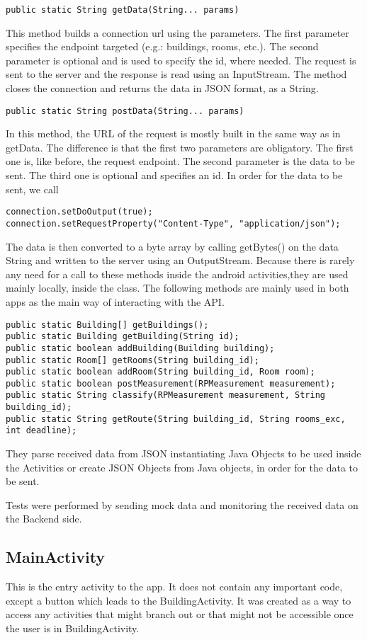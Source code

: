 \begin{lstlisting}
public static String getData(String... params)
\end{lstlisting}
This method builds a connection url using the parameters. The first parameter specifies the endpoint targeted (e.g.: buildings, rooms, etc.). The second parameter is optional and is used to specify the id, where needed. The request is sent to the server and the response is read using an InputStream. The method closes the connection and returns the data in JSON format, as a String.

\begin{lstlisting}
public static String postData(String... params)
\end{lstlisting}
In this method, the URL of the request is mostly built in the same way as in getData. The difference is that the first two parameters are obligatory. The first one is, like before, the request endpoint. The second parameter is the data to be sent. The third one is optional and specifies an id. 
In order for the data to be sent, we call
\begin{lstlisting}
connection.setDoOutput(true);
connection.setRequestProperty("Content-Type", "application/json");
\end{lstlisting}
The data is then converted to a byte array by calling getBytes() on the data String and written to the server using an OutputStream.
Because there is rarely any need for a call to these methods inside the android activities,they are used mainly locally, inside the class. The following methods are mainly used in both apps as the main way of interacting with the API.
\begin{lstlisting}
public static Building[] getBuildings();
public static Building getBuilding(String id);
public static boolean addBuilding(Building building);
public static Room[] getRooms(String building_id);
public static boolean addRoom(String building_id, Room room);
public static boolean postMeasurement(RPMeasurement measurement);
public static String classify(RPMeasurement measurement, String building_id);
public static String getRoute(String building_id, String rooms_exc, int deadline);
\end{lstlisting}
They parse received data from JSON instantiating Java Objects to be used inside the Activities or create JSON Objects from Java objects, in order for the data to be sent.

Tests were performed by sending mock data and monitoring the received data on the Backend side.
\subsection{MainActivity}
This is the entry activity to the app. It does not contain any important code, except a button which leads to the BuildingActivity. It was created as a way to access any activities that might branch out or that might not be accessible once the user is in BuildingActivity.

